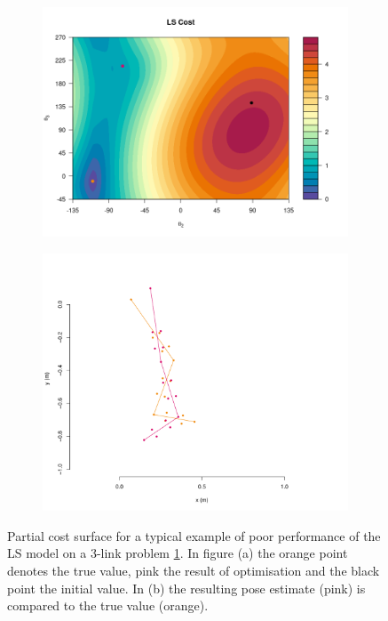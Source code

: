 \documentclass{article}
\begin{document}
\begin{figure}
     \centering
     \begin{subfigure}[b]{0.45\textwidth}
         \centering
         \includegraphics[width=\textwidth]{./Figures/LSCost.png}
         \caption{}
         \label{fig:LSCost}
     \end{subfigure}
     \hfill
     \begin{subfigure}[b]{0.45\textwidth}
         \centering
         \includegraphics[width=\textwidth]{./Figures/LSCostPoses.pdf}
         \caption{}
         \label{fig:LSCostPose}
     \end{subfigure}
             \caption{Partial cost surface for a typical example of poor performance of the LS model on a 3-link problem \ref{fig:LSCost}.  In figure (a) the orange point denotes the true value, pink the result of optimisation and the black point the initial value.  In (b) the resulting pose estimate (pink) is compared to the true value (orange).}
        \label{fig:LSCostFigs}
\end{figure}
\end{document}
